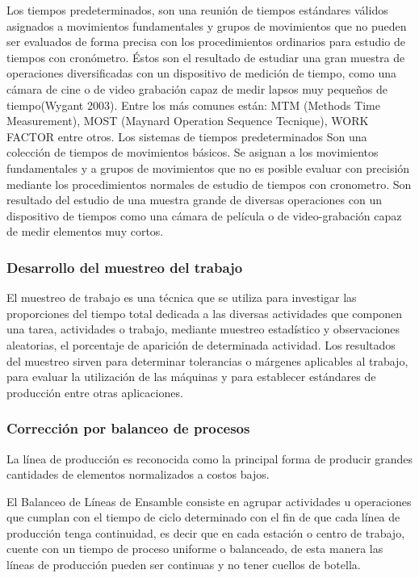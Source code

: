 Los tiempos predeterminados, son una reunión de tiempos estándares válidos asignados a movimientos fundamentales y grupos de movimientos que no pueden ser evaluados de forma precisa con los procedimientos ordinarios para estudio de tiempos con cronómetro. Éstos son el resultado de estudiar una gran muestra de operaciones diversificadas con un dispositivo de medición de tiempo, como una cámara de cine o de video grabación capaz de medir lapsos muy pequeños de tiempo(Wygant 2003). Entre los más comunes están: MTM (Methods Time Measurement), MOST (Maynard Operation Sequence Tecnique), WORK FACTOR entre otros. \cite{Tiempospredeterminados}
\newline
Los sistemas de tiempos predeterminados Son una colección de tiempos de movimientos básicos. Se asignan a los movimientos fundamentales y a grupos de movimientos que no es posible evaluar con precisión mediante los procedimientos normales de estudio de tiempos con cronometro. Son resultado del estudio de una muestra grande de diversas operaciones con un dispositivo de tiempos como una cámara de película o de video-grabación capaz de medir elementos muy cortos. \cite{Sistemadetiempos}
%
%
\subsubsection{Desarrollo del muestreo del trabajo}

El muestreo de trabajo es una técnica que se utiliza para investigar las proporciones del tiempo total dedicada a las diversas actividades que componen una tarea, actividades o trabajo, mediante muestreo estadístico y observaciones aleatorias, el porcentaje de aparición de determinada actividad. Los resultados del muestreo sirven para determinar tolerancias o márgenes aplicables al trabajo, para evaluar la utilización de las máquinas y para establecer estándares de producción entre otras aplicaciones. \cite{Muestreodetrabajo}
%
%
\subsubsection{Corrección por balanceo de procesos}

La línea de producción es reconocida como la principal forma de producir grandes cantidades de elementos normalizados a costos bajos.

El Balanceo de Líneas de Ensamble consiste en agrupar actividades u operaciones que cumplan con el tiempo de ciclo determinado con el fin de que cada línea de producción tenga continuidad, es decir que en cada estación o centro de trabajo, cuente con un tiempo de proceso uniforme o balanceado, de esta manera las líneas de producción pueden ser continuas y no tener cuellos de botella.

